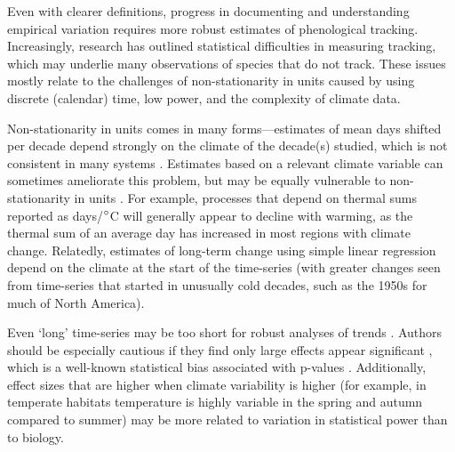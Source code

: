 \documentclass[11pt,letterpaper]{article}
\begin{document}
Even with clearer definitions, progress in documenting and understanding empirical variation requires more robust estimates of phenological tracking. Increasingly, research has outlined statistical difficulties in measuring tracking, which may underlie many observations of species that do not track. These issues mostly relate to the challenges of non-stationarity in units caused by using discrete (calendar) time, low power, and the complexity of climate data. 

Non-stationarity in units comes in many forms---estimates of mean days shifted per decade depend strongly on the climate of the decade(s) studied, which is not consistent in many systems \citep{McCabe2012}. Estimates based on a relevant climate variable can sometimes ameliorate this problem, but may be equally vulnerable to non-stationarity in units \citep[e.g.,][]{Sagarin:2001fu}. For example, processes that depend on thermal sums reported as days/$\degree$C will generally appear to decline with warming, as the thermal sum of an average day has increased in most regions with climate change. Relatedly, estimates of long-term change using simple linear regression depend on the climate at the start of the time-series (with greater changes seen from time-series that started in unusually cold decades, such as the 1950s for much of North America). 

Even `long' time-series may be too short for robust analyses of trends \citep{bolmgren2013}. Authors should be especially cautious if they find only large effects appear significant \citep[e.g.,][]{CaraDonna2014}, which is a well-known statistical bias associated with p-values \citep{loken2017}. Additionally, effect sizes that are higher when climate variability is higher (for example, in temperate habitats temperature is highly variable in the spring and autumn compared to summer) may be more related to variation in statistical power than to biology. 
\end{document}
